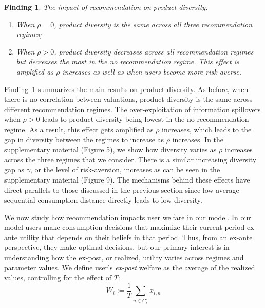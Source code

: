 \documentclass[format=acmsmall, review=false]{acmart}
\newtheorem{finding}{Finding}
\begin{document}
\begin{finding}\label{finding_diversity}
The impact of recommendation on product diversity:
\begin{enumerate}
\item When $\rho = 0$, product diversity is the same across all three recommendation regimes;
\item When $\rho > 0$, product diversity decreases across all recommendation regimes but decreases the most in the no recommendation regime. This effect is amplified as $\rho$ increases as well as when users become more risk-averse.
\end{enumerate}
\end{finding}
\par 
Finding~\ref{finding_diversity} summarizes the main results on product diversity. As before, when there is no correlation between valuations, product diversity is the same across different recommendation regimes. The over-exploitation of information spillovers when $\rho > 0$ leads to product diversity being lowest in the no recommendation regime. As a result, this effect gets amplified as $\rho$ increases, which leads to the gap in diversity between the regimes to increase as $\rho$ increases. In the supplementary material (Figure 5), we show how diversity varies as $\rho$ increases across the three regimes that we consider. There is a similar increasing diversity gap as $\gamma$, or the level of risk-aversion, increases as can be seen in the supplementary material (Figure 9). The mechanisms behind these effects have direct parallels to those discussed in the previous section since low average sequential consumption distance directly leads to low diversity.
\par 
We now study how recommendation impacts user welfare in our model. In our model users make consumption decisions that maximize their current period ex-ante utility that depends on their beliefs in that period. Thus, from an ex-ante perspective, they make optimal decisions, but our primary interest is in understanding how the ex-post, or realized, utility varies across regimes and parameter values. We define user's \textit{ex-post} welfare as the average of the realized values, controlling for the effect of $T$:
$$W_i:= \frac{1}{T}\sum_{n \in C_i^T} x_{i,n}$$
\end{document}
